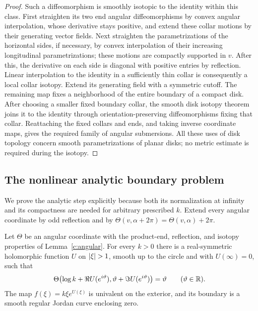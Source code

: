 \begin{proof}
Such a diffeomorphism is smoothly isotopic to the identity within this
class.  First straighten its two end angular diffeomorphisms by convex
angular interpolation, whose derivative stays positive, and extend
these collar motions by their generating vector fields.  Next
straighten the parametrizations of the horizontal sides, if necessary,
by convex interpolation of their increasing longitudinal
parametrizations; these motions are compactly supported in $v$.
After this, the derivative on each side is diagonal with positive
entries by reflection.  Linear interpolation to the identity in a
sufficiently thin collar is consequently a local collar isotopy.
Extend its generating field with a symmetric cutoff.  The remaining
map fixes a neighborhood of the entire boundary of a compact disk.
After choosing a smaller fixed boundary collar, the smooth disk
isotopy theorem~\cite[Theorem~4]{Smale1959} joins it to the identity
through orientation-preserving diffeomorphisms fixing that collar.
Reattaching the fixed collars and ends, and taking inverse coordinate
maps, gives the required family of angular submersions.  All these
uses of disk topology concern smooth parametrizations of planar disks;
no metric estimate is required during the isotopy.
\end{proof}

\subsection{The nonlinear analytic boundary problem}

We prove the analytic step explicitly because both its normalization at
infinity and its compactness are needed for arbitrary prescribed $k$.
Extend every angular coordinate by odd reflection and by
$\Theta(v,\alpha+2\pi)=\Theta(v,\alpha)+2\pi$.

\begin{lemma}\label{c:analytic}
Let $\Theta$ be an angular coordinate with the product-end, reflection,
and isotopy properties of Lemma~\ref{c:angular}.  For every $k>0$ there
is a real-symmetric holomorphic function $U$ on $\lvert\xi\rvert>1$, smooth
up to the circle and with $U(\infty)=0$, such that
\begin{equation}\label{c:boundary-equation}
 \Theta\bigl(\log k+\Re U(e^{i\vartheta}),
                   \vartheta+\Im U(e^{i\vartheta})\bigr)=\vartheta
 \qquad(\vartheta\in\mathbb R).
\end{equation}
The map $f(\xi)=k\xi e^{U(\xi)}$ is univalent on the exterior, and its
boundary is a smooth regular Jordan curve enclosing zero.
\end{lemma}


